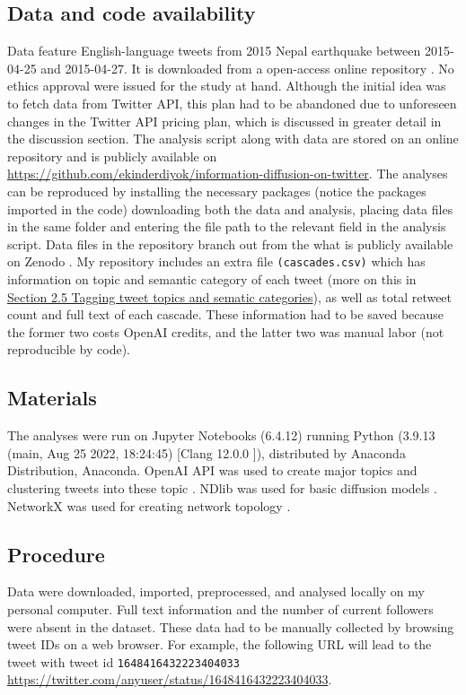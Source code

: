 \documentclass[11pt,a4paper]{article}
\begin{document}
    \subsection{Data and code availability}
    Data feature English-language tweets from 2015 Nepal earthquake between 2015-04-25 and 2015-04-27. It is downloaded from a open-access online repository \cite{bhowmick_twitter_2019}. No ethics approval were issued for the study at hand. Although the initial idea was to fetch data from Twitter API, this plan had to be abandoned due to unforeseen changes in the Twitter API pricing plan, which is discussed in greater detail in the discussion section. The analysis script along with data are stored on an online repository and is publicly available on \href{https://github.com/ekinderdiyok/information-diffusion-on-twitter}{https://github.com/ekinderdiyok/information-diffusion-on-twitter}. The analyses can be reproduced by installing the necessary packages (notice the packages imported in the code) downloading both the data and analysis, placing data files in the same folder and entering the file path to the relevant field in the analysis script. Data files in the repository branch out from the what is publicly available on Zenodo \cite{bhowmick_twitter_2019}. My repository includes an extra file \texttt{(cascades.csv)} which has information on topic and semantic category of each tweet (more on this in \hyperlink{sec:tagging-tweet-topic}{Section 2.5 Tagging tweet topics and sematic categories}), as well as total retweet count and full text of each cascade. These information had to be saved because the former two costs OpenAI credits, and the latter two was manual labor (not reproducible by code).

    \subsection{Materials}
    The analyses were run on Jupyter Notebooks (6.4.12) running Python (3.9.13 (main, Aug 25 2022, 18:24:45) [Clang 12.0.0 ]), distributed by Anaconda Distribution, Anaconda\textregistered. OpenAI API was used to create major topics and clustering tweets into these topic \cite{openai_llc_openai_2023-1}. NDlib was used for basic diffusion models \cite{rossetti_ndlib_2018,rossetti_ndlib_2017}. NetworkX was used for creating network topology \cite{hagberg_exploring_2008}.
    
    \subsection{Procedure}
    Data were downloaded, imported, preprocessed, and analysed locally on my personal computer. Full text information and the number of current followers were absent in the dataset. These data had to be manually collected by browsing tweet IDs on a web browser. For example, the following URL will lead to the tweet with tweet id \texttt{1648416432223404033} \href{https://twitter.com/anyuser/status/1648416432223404033}{https://twitter.com/anyuser/status/1648416432223404033}.
    
\end{document}
